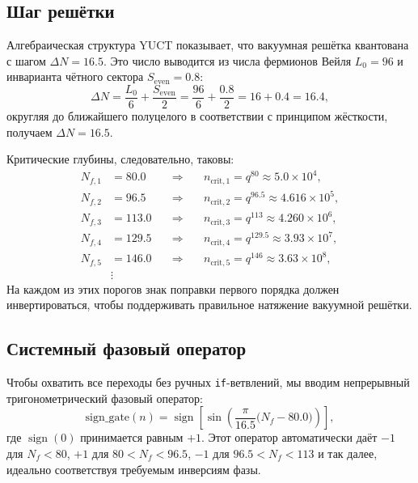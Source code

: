 \documentclass[12pt,a4paper]{article}
\newcommand{\Seven}{S_{\mathrm{even}}}
\begin{document}
	\subsection{Шаг решётки}
	Алгебраическая структура YUCT показывает, что вакуумная решётка квантована с шагом $\Delta N = 16.5$. Это число выводится из числа фермионов Вейля $L_0 = 96$ и инварианта чётного сектора $\Seven = 0.8$:
	\[
	\Delta N = \frac{L_0}{6} + \frac{\Seven}{2} = \frac{96}{6} + \frac{0.8}{2} = 16 + 0.4 = 16.4,
	\]
	округляя до ближайшего полуцелого в соответствии с принципом жёсткости, получаем $\Delta N = 16.5$.
	
	Критические глубины, следовательно, таковы:
	\begin{align}
		N_{f,1} &= 80.0 \quad &\Longrightarrow&\quad n_{\mathrm{crit},1} = q^{80} \approx 5.0\times10^4, \\
		N_{f,2} &= 96.5 \quad &\Longrightarrow&\quad n_{\mathrm{crit},2} = q^{96.5} \approx 4.616\times10^5, \\
		N_{f,3} &= 113.0 \quad &\Longrightarrow&\quad n_{\mathrm{crit},3} = q^{113} \approx 4.260\times10^6, \\
		N_{f,4} &= 129.5 \quad &\Longrightarrow&\quad n_{\mathrm{crit},4} = q^{129.5} \approx 3.93\times10^7, \\
		N_{f,5} &= 146.0 \quad &\Longrightarrow&\quad n_{\mathrm{crit},5} = q^{146} \approx 3.63\times10^8, \\
		&\vdots & &
	\end{align}
	На каждом из этих порогов знак поправки первого порядка должен инвертироваться, чтобы поддерживать правильное натяжение вакуумной решётки.
	
	\subsection{Системный фазовый оператор}
	Чтобы охватить все переходы без ручных \texttt{if}-ветвлений, мы вводим непрерывный тригонометрический фазовый оператор:
	\begin{equation}
		\boxed{\mathrm{sign\_gate}(n) = \operatorname{sign}\!\left[\sin\!\left(\frac{\pi}{16.5}\bigl(N_f - 80.0\bigr)\right)\right]},
		\label{eq:phaseoperator}
	\end{equation}
	где $\operatorname{sign}(0)$ принимается равным $+1$. Этот оператор автоматически даёт $-1$ для $N_f<80$, $+1$ для $80 < N_f < 96.5$, $-1$ для $96.5 < N_f < 113$ и так далее, идеально соответствуя требуемым инверсиям фазы.
	
\end{document}

